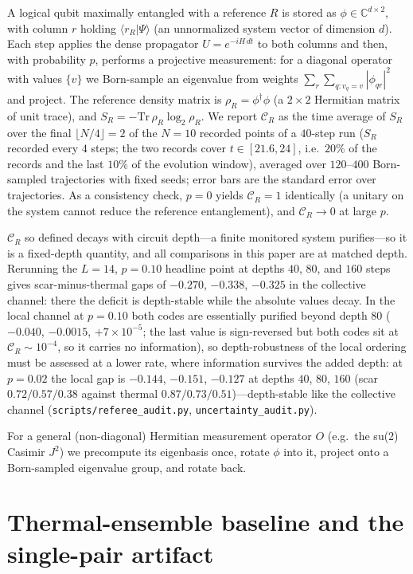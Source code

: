 \documentclass[a4paper,11pt,twocolumn,unpublished]{quantumarticle}
\newcommand{\CR}{\mathcal{C}_R}
\begin{document}
A logical qubit maximally entangled with a reference $R$ is stored as
$\phi\in\mathbb{C}^{d\times2}$, with column $r$ holding $\langle r_R|\Psi\rangle$
(an unnormalized system vector of dimension $d$). Each step applies the dense
propagator $U=e^{-iH\,dt}$ to both columns and then, with probability $p$,
performs a projective measurement: for a diagonal operator with values $\{v\}$ we
Born-sample an eigenvalue from weights $\sum_r\sum_{q:v_q=v}|\phi_{qr}|^2$ and
project. The reference density matrix is $\rho_R=\phi^\dagger\phi$ (a $2\times2$
Hermitian matrix of unit trace), and $S_R=-\mathrm{Tr}\,\rho_R\log_2\rho_R$. We
report $\CR$ as the time average of $S_R$ over the final
$\lfloor N/4\rfloor=2$ of the $N=10$ recorded points of a $40$-step run
($S_R$ recorded every $4$ steps; the two records cover $t\in[21.6,24]$,
i.e.\ $20\%$ of the records and the last $10\%$ of the evolution window),
averaged over $120$--$400$ Born-sampled trajectories with
fixed seeds; error bars are the standard error over trajectories. As a
consistency check, $p=0$ yields $\CR=1$ identically (a unitary on the system
cannot reduce the reference entanglement), and $\CR\to0$ at large $p$.

$\CR$ so defined decays with circuit depth---a finite monitored system
purifies---so it is a fixed-depth quantity, and all comparisons in this paper
are at matched depth. Rerunning the
$L{=}14$, $p{=}0.10$ headline point at depths $40$, $80$, and $160$ steps
gives scar-minus-thermal gaps of $-0.270$, $-0.338$,
$-0.325$ in the collective channel: there the deficit is depth-stable while
the absolute values decay. In the local channel at $p=0.10$ both codes are
essentially purified beyond depth $80$ ($-0.040$, $-0.0015$, $+7\times
10^{-5}$; the last value is sign-reversed but both codes sit at
$\CR\sim10^{-4}$, so it carries no information), so
depth-robustness of the local ordering must be assessed at a lower rate,
where information survives the added depth: at $p=0.02$ the local gap is
$-0.144$, $-0.151$, $-0.127$ at depths $40$, $80$, $160$ (scar
$0.72/0.57/0.38$ against thermal $0.87/0.73/0.51$)---depth-stable like the
collective channel
(\texttt{scripts/referee\_audit.py}, \texttt{uncertainty\_audit.py}).

For a general (non-diagonal) Hermitian measurement operator $O$ (e.g.\ the su(2)
Casimir $J^2$) we precompute its eigenbasis once, rotate $\phi$ into it, project
onto a Born-sampled eigenvalue group, and rotate back.

\section{Thermal-ensemble baseline and the single-pair artifact}
\label{app:ensemble}
\end{document}
